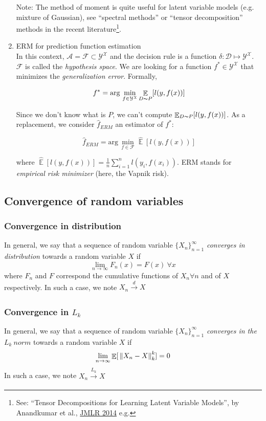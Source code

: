 \documentclass[12pt]{report}
\DeclareMathOperator{\E}{\mathbb{E}}
\begin{document}
\begin{enumerate}
Note: The method of moment is quite useful for latent variable models (e.g. mixture of Gaussian), see ``spectral methods'' or ``tensor decomposition'' methods in the recent literature\footnote{See: ``Tensor Decompositions for Learning Latent Variable Models'', by Anandkumar et al., \href{http://jmlr.org/papers/v15/anandkumar14b.html}{JMLR 2014} e.g.}.

\item ERM for prediction function estimation\\
In this context, $\mathcal{A}= \mathcal{F} \subset \mathcal{Y}^\mathcal{X}$ and the decision rule is a function $\delta: \mathcal{D} \mapsto \mathcal{Y}^\mathcal{X}$. $\mathcal{F}$ is called the \textit{hypothesis space}. We are looking for a function $f^*\in \mathcal{Y}^\mathcal{X}$ that minimizes the \textit{generalization error}. Formally,

$$f^*=\text{arg}\,\min\limits_{f \in \mathcal{Y}^\mathcal{X}} \E_{D \thicksim P}[l(y,f(x))]$$

Since we don't know what is $P$, we can't compute $\E_{D \thicksim P}[l(y,f(x))]$. As a replacement, we consider $\hat{f}_{ERM}$ an estimator of $f^*$:

$$\hat{f}_{ERM} = \text{arg}\,\min\limits_{f \in \mathcal{F}} \hat{\E}[l(y,f(x))]$$

where $\hat{\E}[l(y,f(x))]= \frac{1}{n}\sum_{i = 1}^n l(y_i,f(x_i)) $. ERM stands for \textit{empirical risk minimizer} (here, the Vapnik risk).

\end{enumerate}

\subsection{Convergence of random variables}
\subsubsection{Convergence in distribution}
In general, we say that a sequence of random variable $\{X_n\}_{n=1}^\infty$ \textit{converges in distribution} towards a random variable $X$ if 
$$\lim_{n \to \infty}F_n(x)=F(x)\ \forall x$$
where $F_n$ and $F$ correspond the cumulative functions of $X_n \forall n$ and of $X$ respectively.
In such a case, we note $X_n \xrightarrow[]{d} X$

\subsubsection{Convergence in $L_k$}
In general, we say that a sequence of random variable $\{X_n\}_{n=1}^\infty$ \textit{converges in the $L_k\ norm$} towards a random variable $X$ if 
$$\lim_{n \to \infty}\E[\ \norm{X_n-X}^k_k]=0$$
In such a case, we note $X_n \xrightarrow[]{L_k} X$
\end{document}
